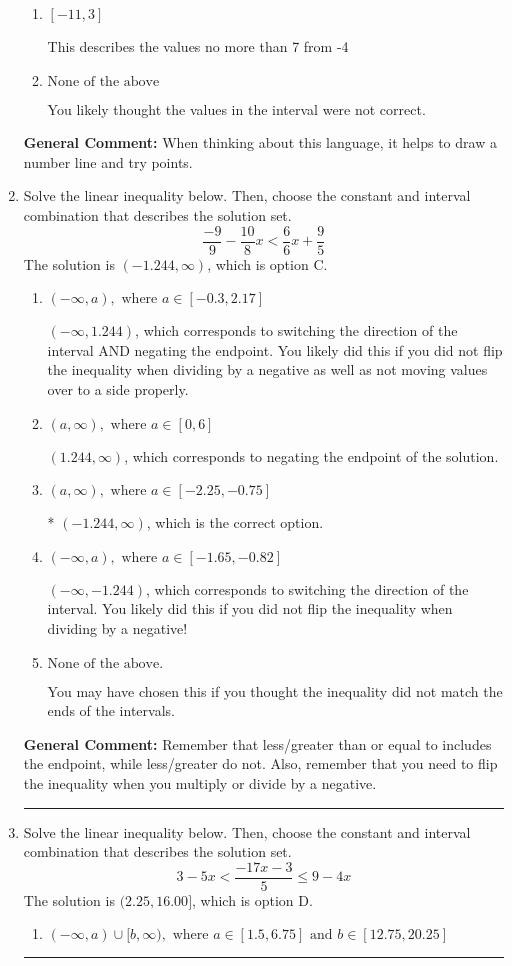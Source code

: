\documentclass{extbook}[14pt]
\newcommand{\litem}[1]{\item #1

\rule{\textwidth}{0.4pt}}
\begin{document}
\begin{enumerate}
{\begin{enumerate}[label=\Alph*.]
This describes the values less than 7 from -4
\item \( [-11, 3] \)

This describes the values no more than 7 from -4
\item \( \text{None of the above} \)

You likely thought the values in the interval were not correct.
\end{enumerate}

\textbf{General Comment:} When thinking about this language, it helps to draw a number line and try points.
}
\litem{
Solve the linear inequality below. Then, choose the constant and interval combination that describes the solution set.
\[ \frac{-9}{9} - \frac{10}{8} x < \frac{6}{6} x + \frac{9}{5} \]The solution is \( (-1.244, \infty) \), which is option C.\begin{enumerate}[label=\Alph*.]
\item \( (-\infty, a), \text{ where } a \in [-0.3, 2.17] \)

 $(-\infty, 1.244)$, which corresponds to switching the direction of the interval AND negating the endpoint. You likely did this if you did not flip the inequality when dividing by a negative as well as not moving values over to a side properly.
\item \( (a, \infty), \text{ where } a \in [0, 6] \)

 $(1.244, \infty)$, which corresponds to negating the endpoint of the solution.
\item \( (a, \infty), \text{ where } a \in [-2.25, -0.75] \)

* $(-1.244, \infty)$, which is the correct option.
\item \( (-\infty, a), \text{ where } a \in [-1.65, -0.82] \)

 $(-\infty, -1.244)$, which corresponds to switching the direction of the interval. You likely did this if you did not flip the inequality when dividing by a negative!
\item \( \text{None of the above}. \)

You may have chosen this if you thought the inequality did not match the ends of the intervals.
\end{enumerate}

\textbf{General Comment:} Remember that less/greater than or equal to includes the endpoint, while less/greater do not. Also, remember that you need to flip the inequality when you multiply or divide by a negative.
}
\litem{
Solve the linear inequality below. Then, choose the constant and interval combination that describes the solution set.
\[ 3 - 5 x < \frac{-17 x - 3}{5} \leq 9 - 4 x \]The solution is \( (2.25, 16.00] \), which is option D.\begin{enumerate}[label=\Alph*.]
\item \( (-\infty, a) \cup [b, \infty), \text{ where } a \in [1.5, 6.75] \text{ and } b \in [12.75, 20.25] \)


\end{enumerate}}
\end{enumerate}
\end{document}
